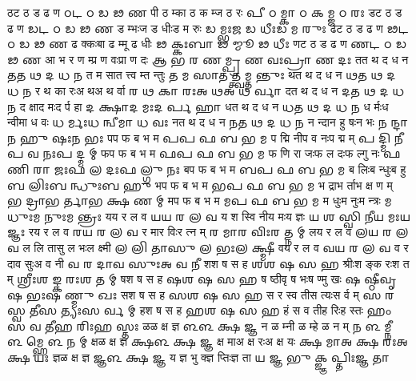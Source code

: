 \documentclass{article}
\begin{document}
\card
{ठ}{ट ठ ड ढ ण}%
{𑌠}{𑌟 𑌠 𑌡 𑌢 𑌣}
{{पी ठ म्}{का ठ क म्}{ज ठ रः}}%
{{𑌪𑍀 𑌠 𑌮𑍍}{𑌕𑌾 𑌠 𑌕 𑌮𑍍}{𑌜 𑌠 𑌰𑌃}}
\card
{ड}{ट ठ ड ढ ण}%
{𑌡}{𑌟 𑌠 𑌡 𑌢 𑌣}
{{ड म्भः}{ज ड धीः}{ड म रुः}}%
{{𑌡 𑌮𑍍𑌭𑌃}{𑌜 𑌡 𑌧𑍀𑌃}{𑌡 𑌮 𑌰𑍁𑌃}}
\card
{ढ}{ट ठ ड ढ ण}%
{𑌢}{𑌟 𑌠 𑌡 𑌢 𑌣}
{{ढ क्कः}{बा ढ म्}{मू ढ धीः}}%
{{𑌢 𑌕𑍍𑌕𑌃}{𑌬𑌾 𑌢 𑌮𑍍}{𑌮𑍂 𑌢 𑌧𑍀𑌃}}
\card
{ण}{ट ठ ड ढ ण}%
{𑌣}{𑌟 𑌠 𑌡 𑌢 𑌣}
{{आ भ र ण म्}{प्र ण वः}{प्रा ण दः}}%
{{𑌆 𑌭 𑌰 𑌣 𑌮𑍍}{𑌪𑍍𑌰 𑌣 𑌵𑌃}{𑌪𑍍𑌰𑌾 𑌣 𑌦𑌃}}
\card
{त}{त थ द ध न}%
{𑌤}{𑌤 𑌥 𑌦 𑌧 𑌨}
{{त म सा}{त त्त्व म्}{त न्तुः}}%
{{𑌤 𑌮 𑌸𑌾}{𑌤 𑌤𑍍𑌤𑍍𑌵 𑌮𑍍}{𑌤 𑌨𑍍𑌤𑍁𑌃}}
\card
{थ}{त थ द ध न}%
{𑌥}{𑌤 𑌥 𑌦 𑌧 𑌨}
{{र थ का रः}{अ थ}{अ थ र्वा}}%
{{𑌰 𑌥 𑌕𑌾 𑌰𑌃}{𑌅 𑌥}{𑌅 𑌥 𑌰𑍍𑌵𑌾}}
\card
{द}{त थ द ध न}%
{𑌦}{𑌤 𑌥 𑌦 𑌧 𑌨}
{{द क्षा}{द मः}{द र्प हा}}%
{{𑌦 𑌕𑍍𑌷𑌾}{𑌦 𑌮𑌃}{𑌦 𑌰𑍍𑌪 𑌹𑌾}}
\card
{ध}{त थ द ध न}%
{𑌧}{𑌤 𑌥 𑌦 𑌧 𑌨}
{{ध र्मः}{ध न्वी}{मा ध वः}}%
{{𑌧 𑌰𑍍𑌮𑌃}{𑌧 𑌨𑍍𑌵𑍀}{𑌮𑌾 𑌧 𑌵𑌃}}
\card
{न}{त थ द ध न}%
{𑌨}{𑌤 𑌥 𑌦 𑌧 𑌨}
{{न न्दा}{न हु षः}{न भः}}%
{{𑌨 𑌨𑍍𑌦𑌾}{𑌨 𑌹𑍁 𑌷𑌃}{𑌨 𑌭𑌃}}
\card
{प}{प फ ब भ म}%
{𑌪}{𑌪 𑌫 𑌬 𑌭 𑌮}
{{प द्मि नी}{प व नः}{प द्म म्}}%
{{𑌪 𑌦𑍍𑌮𑌿 𑌨𑍀}{𑌪 𑌵 𑌨𑌃}{𑌪 𑌦𑍍𑌮 𑌮𑍍}}
\card
{फ}{प फ ब भ म}%
{𑌫}{𑌪 𑌫 𑌬 𑌭 𑌮}
{{फ णि रा जः}{फ ल दः}{फ ल्गु नः}}%
{{𑌫 𑌣𑌿 𑌰𑌾 𑌜𑌃}{𑌫 𑌲 𑌦𑌃}{𑌫 𑌲𑍍𑌗𑍁 𑌨𑌃}}
\card
{ब}{प फ ब भ म}%
{𑌬}{𑌪 𑌫 𑌬 𑌭 𑌮}
{{ब लिः}{ब न्धुः}{ब हु}}%
{{𑌬 𑌲𑌿𑌃}{𑌬 𑌨𑍍𑌧𑍁𑌃}{𑌬 𑌹𑍁}}
\card
{भ}{प फ ब भ म}%
{𑌭}{𑌪 𑌫 𑌬 𑌭 𑌮}
{{भ द्रा}{भ र्ता}{भ क्ष ण म्}}%
{{𑌭 𑌦𑍍𑌰𑌾}{𑌭 𑌰𑍍𑌤𑌾}{𑌭 𑌕𑍍𑌷 𑌣 𑌮𑍍}}
\card
{म}{प फ ब भ म}%
{𑌮}{𑌪 𑌫 𑌬 𑌭 𑌮}
{{म धुः}{म नुः}{म न्त्रः}}%
{{𑌮 𑌧𑍁𑌃}{𑌮 𑌨𑍁𑌃}{𑌮 𑌨𑍍𑌤𑍍𑌰𑌃}}
\card
{य}{य र ल व}%
{𑌯}{𑌯 𑌰 𑌲 𑌵}
{{य श स्वि नी}{य मः}{य ज्ञः}}%
{{𑌯 𑌶 𑌸𑍍𑌵𑌿 𑌨𑍀}{𑌯 𑌮𑌃}{𑌯 𑌜𑍍𑌞𑌃}}
\card
{र}{य र ल व}%
{𑌰}{𑌯 𑌰 𑌲 𑌵}
{{र मा}{र विः}{र त्न म्}}%
{{𑌰 𑌮𑌾}{𑌰 𑌵𑌿𑌃}{𑌰 𑌤𑍍𑌨 𑌮𑍍}}
\card
{ल}{य र ल व}%
{𑌲}{𑌯 𑌰 𑌲 𑌵}
{{ल लि ता}{सु ल भः}{ल क्ष्मी}}%
{{𑌲 𑌲𑌿 𑌤𑌾}{𑌸𑍁 𑌲 𑌭𑌃}{𑌲 𑌕𑍍𑌷𑍍𑌮𑍀}}
\card
{व}{य र ल व}%
{𑌵}{𑌯 𑌰 𑌲 𑌵}
{{व र दा}{व सुः}{अ व नी}}%
{{𑌵 𑌰 𑌦𑌾}{𑌵 𑌸𑍁𑌃}{𑌅 𑌵 𑌨𑍀}}
\card
{श}{श ष स ह}%
{𑌶}{𑌶 𑌷 𑌸 𑌹}
{{श्रीः}{श ङ्क रः}{श त म्}}%
{{𑌶𑍍𑌰𑍀𑌃}{𑌶 𑌙𑍍𑌕 𑌰𑌃}{𑌶 𑌤 𑌮𑍍}}
\card
{ष}{श ष स ह}%
{𑌷}{𑌶 𑌷 𑌸 𑌹}
{{ष ष्ठी}{वृ ष भः}{ष ण्मु खः}}%
{{𑌷 𑌷𑍍𑌠𑍀}{𑌵𑍃 𑌷 𑌭𑌃}{𑌷 𑌣𑍍𑌮𑍁 𑌖𑌃}}
\card
{स}{श ष स ह}%
{𑌸}{𑌶 𑌷 𑌸 𑌹}
{{स र स्व ती}{स त्यः}{स र्व म्}}%
{{𑌸 𑌰 𑌸𑍍𑌵 𑌤𑍀}{𑌸 𑌤𑍍𑌯𑌃}{𑌸 𑌰𑍍𑌵 𑌮𑍍}}
\card
{ह}{श ष स ह}%
{𑌹}{𑌶 𑌷 𑌸 𑌹}
{{हं स व ती}{ह रिः}{ह स्तः}}%
{{𑌹𑌂 𑌸 𑌵 𑌤𑍀}{𑌹 𑌰𑌿𑌃}{𑌹 𑌸𑍍𑌤𑌃}}
\card
{ळ}{ळ क्ष ज्ञ}%
{𑌳}{𑌳 𑌕𑍍𑌷 𑌜𑍍𑌞}
{{न ळ म्}{नी ळ म्}{हे ळ न म्}}%
{{𑌨 𑌳 𑌮𑍍}{𑌨𑍀 𑌳 𑌮𑍍}{𑌹𑍇 𑌳 𑌨 𑌮𑍍}}
\card
{क्ष}{ळ क्ष ज्ञ}%
{𑌕𑍍𑌷}{𑌳 𑌕𑍍𑌷 𑌜𑍍𑌞}
{{क्ष मा}{अ क्ष रः}{अ क्ष यः}}%
{{𑌕𑍍𑌷 𑌮𑌾}{𑌅 𑌕𑍍𑌷 𑌰𑌃}{𑌅 𑌕𑍍𑌷 𑌯𑌃}}
\card
{ज्ञ}{ळ क्ष ज्ञ}%
{𑌜𑍍𑌞}{𑌳 𑌕𑍍𑌷 𑌜𑍍𑌞}
{{य ज्ञ भु क्}{ज्ञ प्तिः}{ज्ञ ता}}%
{{𑌯 𑌜𑍍𑌞 𑌭𑍁 𑌕𑍍}{𑌜𑍍𑌞 𑌪𑍍𑌤𑌿𑌃}{𑌜𑍍𑌞 𑌤𑌾}}
\end{document}
